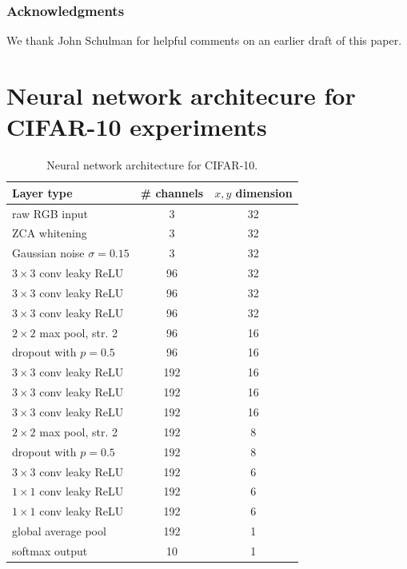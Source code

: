 \documentclass{article}
\begin{document}
\subsubsection*{Acknowledgments}
We thank John Schulman for helpful comments on an earlier draft of this paper.


\small



\newpage
\appendix

\section{Neural network architecure for CIFAR-10 experiments}

\begin{table}[H]
\label{tab:cifar10_model}
\vskip 0.15in
\begin{center}
\begin{tabular}{lcc}
\hline
Layer type & \# channels & $x,y$ dimension \\
\hline
raw RGB input & 3 & 32 \\
ZCA whitening & 3 & 32 \\
Gaussian noise $\sigma=0.15$ & 3 & 32 \\
$3 \times 3$ conv leaky ReLU & 96 & 32 \\
$3 \times 3$ conv leaky ReLU & 96 & 32 \\
$3 \times 3$ conv leaky ReLU & 96 & 32 \\
$2 \times 2$ max pool, str. 2 & 96 & 16 \\
dropout with $p=0.5$ & 96 & 16 \\
$3 \times 3$ conv leaky ReLU & 192 & 16 \\
$3 \times 3$ conv leaky ReLU & 192 & 16 \\
$3 \times 3$ conv leaky ReLU & 192 & 16 \\
$2 \times 2$ max pool, str. 2 & 192 & 8 \\
dropout with $p=0.5$ & 192 & 8 \\
$3 \times 3$ conv leaky ReLU & 192 & 6 \\
$1 \times 1$ conv leaky ReLU & 192 & 6 \\
$1 \times 1$ conv leaky ReLU & 192 & 6 \\
global average pool & 192 & 1 \\
softmax output  & 10 & 1 \\
\hline
\end{tabular}
\caption{Neural network architecture for CIFAR-10.}
\end{center}
\vskip -0.1in
\end{table}
\end{document}
